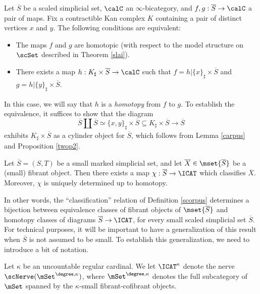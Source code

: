 \begin{remark}\label{callie}
Let $\overline{S}$ be a scaled simplicial set, $\calC$ an $\infty$-bicategory, and
$f,g: \overline{S} \rightarrow \calC$ a pair of maps. Fix a contractible Kan complex $K$ containing a pair of distinct vertices $x$ and $y$. The following conditions are equivalent:
\begin{itemize}
\item The maps $f$ and $g$ are homotopic (with respect to the model structure on
$\scSet$ described in Theorem \ref{slai}). 
\item There exists a map $h: K_{\sharp} \times \overline{S} \rightarrow \calC$
such that $f = h| \{x\}_{\sharp} \times \overline{S}$ and
$g = h| \{y\}_{\sharp} \times \overline{S}$.
\end{itemize}
In this case, we will say that $h$ is a {\it homotopy} from $f$ to $g$. To establish the equivalence, it suffices to show that the diagram
$$ \overline{S} \coprod \overline{S} \simeq \{x,y\}_{\sharp} \times \overline{S}
\subseteq K_{\sharp} \times \overline{S} \rightarrow \overline{S}$$
exhibits $K_{\sharp} \times \overline{S}$ as a cylinder object for $\overline{S}$, which follows from
Lemma \ref{carpus} and Proposition \ref{twop2}.
\end{remark}

\begin{corollary}\label{preil}
Let $\overline{S} = (S,T)$ be a small marked simplicial set, and let
$\overline{X} \in \mset{ \overline{S}}$ be a (small) fibrant object. Then there exists
a map $\chi: \overline{S} \rightarrow \ICAT$ which classifies $\overline{X}$. Moreover,
$\chi$ is uniquely determined up to homotopy.
\end{corollary}

In other words, the ``classification'' relation of Definition \ref{scorpus} determines a bijection
between equivalence classes of fibrant objects of $\mset{ \overline{S} }$ and homotopy classes
of diagrams $\overline{S} \rightarrow \ICAT$, for every small scaled simplicial set $\overline{S}$. 
For technical purposes, it will be important to have a generalization of this result when $\overline{S}$ is not assumed to be small. To establish this generalization, we need to introduce a bit of notation.

\begin{notation}
Let $\kappa$ be an uncountable regular cardinal. We let $\ICAT^{\kappa}$ denote the
nerve $\scNerve( \mSet^{\degree, \kappa})$, where $\mSet^{\degree, \kappa}$ denotes the full subcategory of $\mSet$ spanned by the $\kappa$-small fibrant-cofibrant objects.
\end{notation}

